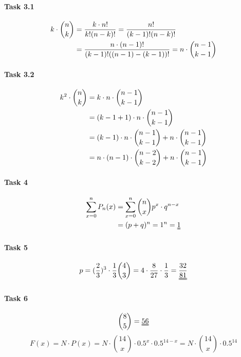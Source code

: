 \documentclass{scrreprt}
\begin{document}
\paragraph*{Task 3.1}
\begin{align}
k \cdot \binom{n}{k} &= \frac{k \cdot n!}{k!(n-k)!} = \frac{n!}{(k-1)!(n-k)!} \notag \\ 
&= \frac{n \cdot (n-1)!}{(k-1)!((n-1)-(k-1))!} = n \cdot \binom{n-1}{k-1}
\end{align}

\paragraph*{Task 3.2}
\begin{align}
k^2 \cdot \binom{n}{k} &= k \cdot n \cdot \binom{n-1}{k-1} \notag \\
&= (k-1+1) \cdot n \cdot \binom{n-1}{k-1} \notag\\
&= (k-1) \cdot n \cdot \binom{n-1}{k-1} + n \cdot \binom{n-1}{k-1} \notag\\
&= n \cdot (n-1) \cdot \binom{n-2}{k-2} + n \cdot \binom{n-1}{k-1}
\end{align}

\paragraph*{Task 4}
\begin{align}
\sum\limits_{x=0}^{n} P_n(x) &= \sum\limits_{x=0}^{n} \binom{n}{x} p^x \cdot q^{n-x} \notag\\
&=(p+q)^n = 1^n = \uuline{1}
\end{align}

\paragraph*{Task 5}
\begin{equation}
p = (\frac{2}{3})^{3} \cdot \frac{1}{3} \binom{4}{3} = 4 \cdot \frac{8}{27} \cdot \frac{1}{3} = \uuline{\frac{32}{81}}
\end{equation}

\paragraph*{Task 6}
\begin{equation}
\binom{8}{5} = \uuline{56}
\end{equation}
\begin{equation}
F(x) = N \cdot P(x) = N \cdot \binom{14}{x} \cdot 0.5^x \cdot 0.5^{14-x} = N \cdot \binom{14}{x}\cdot 0.5^{14}
\end{equation}
\end{document}
